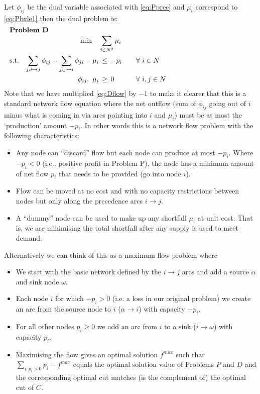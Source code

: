 \documentclass[authoryear,11pt,square,number,times,super,comma]{elsarticle}
\begin{document}
Let $\phi_{ij}$ be the dual variable associated with \eqref{eq:Pprec} and
$\mu_i$ correspond to \eqref{eq:Pbxle1} then the dual problem is:
\begin{alignat}{3}   %
  \noalign{\noindent\bf Problem D}
  &&\min\quad&\sum_{i\in N^0} \mu_i   & \label{eq:Pobj_1}\\
  \text{s.t.} && \sum_{j:i\rightarrow j} \phi_{ij} -
  \sum_{j:j\rightarrow i} \phi_{ji} -\mu_i&\,\leq\, -p_i &\quad&\forall\ i\in N \label{eq:Dflow}\\ 
  && \phi_{ij},\ \mu_i &\,\geq\, 0&& \forall\ i,j\in N\label{eq:Dge0}
\end{alignat}
Note that we have multiplied \eqref{eq:Dflow} by $-1$ to make it clearer that
this is a standard network flow equation where the net outflow (sum of
$\phi_{ij}$ going out of $i$ minus what is coming in via arcs pointing into $i$
and $\mu_i$) must be at most the `production' amount $-p_i$. In other words
this is a network flow problem with the following characteristics:
\begin{itemize}
\item Any node can ``discard'' flow but each node can produce at most $-p_i$.
  Where $-p_i < 0$ (i.e., positive profit in Problem P), the node has a minimum
  amount of net flow $p_i$ that needs to be provided (go into node $i$).
\item Flow can be moved at no cost and with no capacity restrictions between
  nodes but only along the precedence arcs $i\rightarrow j$.
\item A ``dummy'' node can be used to make up any shortfall $\mu_i$ at unit
  cost. That is, we are minimising the total shortfall after any supply is used
  to meet demand.
\end{itemize}
Alternatively we can think of this as a maximum flow problem where
\begin{itemize}
\item We start with the basic network defined by the $i\rightarrow j$ arcs and
  add a source $\alpha$  and sink node $\omega$.
\item Each node $i$ for which $-p_i > 0$ (i.e. a loss in our original
  problem) we create an arc from the source node to $i$ ($\alpha\rightarrow i$) with capacity $-p_i$.
\item For all other nodes $p_i \geq 0$ we add an arc from $i$ to a sink
  ($i\rightarrow \omega$) with capacity $p_i$.
\item Maximising the flow gives an optimal solution $f^{max}$ such that
  $\sum_{i:p_i>0} p_i - f^{max}$ equals the optimal solution value of Problems
  $P$ and $D$ and the corresponding optimal cut matches (is the complement of)
  the optimal cut of $C$.
\end{itemize}
\end{document}
